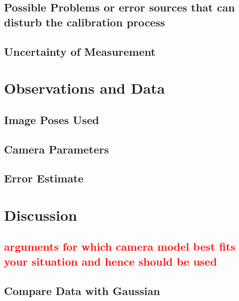 \documentclass[10pt,a4paper]{article}
\begin{document}
		\subsection{Possible Problems or error sources that can disturb the calibration process}
		\subsection{Uncertainty of Measurement}
		
	\section{Observations and Data}
		\subsection{Image Poses Used}
		\subsection{Camera Parameters}
		\subsection{Error Estimate}
	\section{Discussion}
		\subsection{\textcolor{red}{arguments for which camera model best fits your situation and hence should be used}}
		\subsection{Compare Data with Gaussian}			
\end{document}
